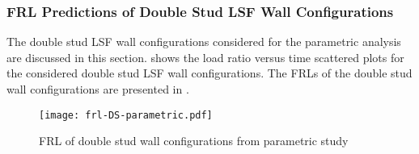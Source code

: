 \subsubsection{FRL Predictions of Double Stud LSF Wall Configurations}

The double stud LSF wall configurations considered for the parametric analysis are discussed in this section.  shows the load ratio versus time scattered plots for the considered double stud LSF wall configurations. The FRLs of the double stud wall configurations are presented in . 
\begin{figure}[!htbp]
	\centering
	\texttt{[image: frl-DS-parametric.pdf]}
	\caption{FRL of double stud wall configurations from parametric study}
	\label{fig:frl-DS-parametric}
\end{figure}
